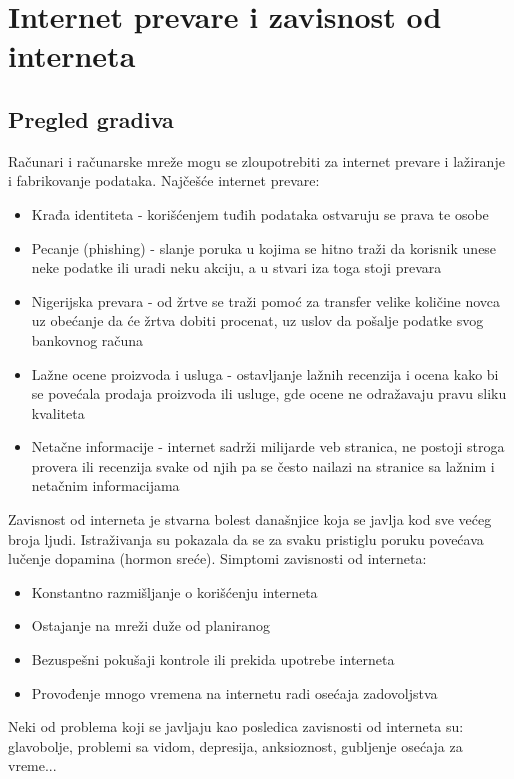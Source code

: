 \documentclass[a4paper,12pt]{article}
\begin{document}
\section{Internet prevare i zavisnost od interneta}
\subsection{Pregled gradiva}

Računari i računarske mreže mogu se zloupotrebiti za internet prevare i lažiranje i fabrikovanje podataka. Najčešće internet prevare:
\begin{itemize}
    \item Krađa identiteta - korišćenjem tuđih podataka ostvaruju se prava te osobe
    \item Pecanje (phishing) - slanje poruka u kojima se hitno traži da korisnik unese neke podatke ili uradi neku akciju, a u stvari iza toga stoji prevara
    \item Nigerijska prevara - od žrtve se traži pomoć za transfer velike količine novca uz obećanje da će žrtva dobiti procenat, uz uslov da pošalje podatke svog bankovnog računa
    \item Lažne ocene proizvoda i usluga - ostavljanje lažnih recenzija i ocena kako bi se povećala prodaja proizvoda ili usluge, gde ocene ne odražavaju pravu sliku kvaliteta
    \item Netačne informacije - internet sadrži milijarde veb stranica, ne postoji stroga provera ili recenzija svake od njih pa se često nailazi na stranice sa lažnim i netačnim informacijama
\end{itemize}

Zavisnost od interneta je stvarna bolest današnjice koja se javlja kod sve većeg broja ljudi. Istraživanja su pokazala da se za svaku pristiglu poruku povećava lučenje dopamina (hormon sreće). Simptomi zavisnosti od interneta:
\begin{itemize}
    \item Konstantno razmišljanje o korišćenju interneta
    \item Ostajanje na mreži duže od planiranog
    \item Bezuspešni pokušaji kontrole ili prekida upotrebe interneta
    \item Provođenje mnogo vremena na internetu radi osećaja zadovoljstva
\end{itemize}
Neki od problema koji se javljaju kao posledica zavisnosti od interneta su: glavobolje, problemi sa vidom, depresija, anksioznost, gubljenje osećaja za vreme... 
\end{document}
